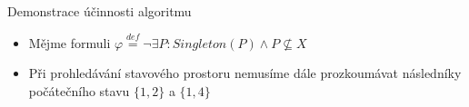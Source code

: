 \documentclass{beamer}
\begin{document}
  
  \begin{frame}[t]{Demonstrace účinnosti algoritmu}
    \begin{itemize}
    \item[] Mějme formuli $\varphi \overset{\mathit{def}}{=}
    \neg\exists P:
    Singleton(P) \wedge P
    \not\subseteq X$
	\item Při prohledávání stavového prostoru nemusíme dále prozkoumávat následníky
	počátečního stavu $\{1, 2\}$ a $\{1, 4\}$
    \end{itemize}
    
      \begin{figure}
 \begin{center}
 \end{center}
\end{figure}
    
  \end{frame}
  
\end{document}
